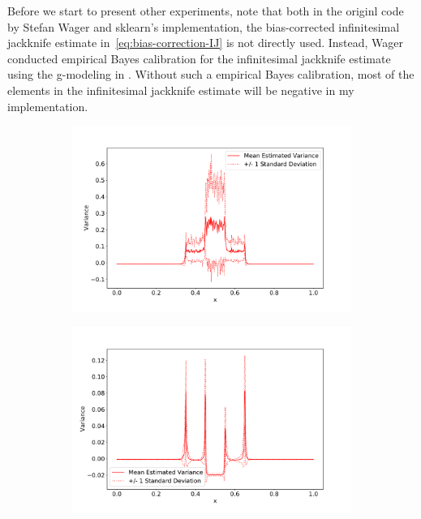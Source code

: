 \documentclass[11pt]{article}
\begin{document}
Before we start to present other experiments, note that both in the originl code by Stefan Wager and sklearn's implementation, the bias-corrected infinitesimal jackknife estimate in~\eqref{eq:bias-correction-IJ} is not directly used.
Instead, Wager conducted empirical Bayes calibration for the infinitesimal jackknife estimate using the g-modeling in \cite{efron2014two}.
Without such a empirical Bayes calibration, most of the elements in the  infinitesimal jackknife estimate will be negative in my implementation.


\begin{figure}[htbp]
	\centering
	\begin{subfigure}[b]{0.32\textwidth}
		\includegraphics[width=1\textwidth]{../figures/figure2_J.pdf}
	\caption{}
	\label{fig:figeure2J}
	\end{subfigure}%
	\begin{subfigure}[b]{0.32\textwidth}
		\includegraphics[width=1\textwidth]{../figures/figure2_J_50k.pdf}

\end{subfigure}
\end{figure}
\end{document}
